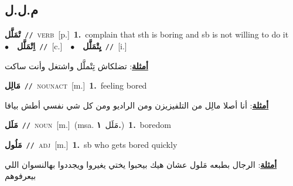 \documentclass[10pt,a4paper,twoside]{article} %
\begin{document}
\begin{multicols}{2}
\vspace{-3mm}
\subsection*{\color{blue}\foreignlanguage{arabic}{م.ل.ل}\color{blue}{}} 

{\setlength\topsep{0pt}\textbf{\foreignlanguage{arabic}{تْمَلَّل}}\ {\color{gray}\texttt{//}\color{black}}\ \textsc{verb}\ [p.]\ \textbf{1.}~complain that sth is boring and sb is not willing to do it\ \ $\bullet$\ \ \setlength\topsep{0pt}\textbf{\foreignlanguage{arabic}{اِتْمَلَّل}}\ {\color{gray}\texttt{//}\color{black}}\ [c.]\ \ $\bullet$\ \ \setlength\topsep{0pt}\textbf{\foreignlanguage{arabic}{يِتْمَلَّل}}\ {\color{gray}\texttt{//}\color{black}}\ [i.]\  \begin{flushright}\color{gray}\foreignlanguage{arabic}{\textbf{\underline{\foreignlanguage{arabic}{أمثلة}}}: تضلكاش تِتْملَّل واشتغل وأنت ساكت}\end{flushright}\color{black}} \vspace{2mm}

{\setlength\topsep{0pt}\textbf{\foreignlanguage{arabic}{مَالِل}}\ {\color{gray}\texttt{//}\color{black}}\ \textsc{noun\textunderscore act}\ [m.]\ \textbf{1.}~feeling bored\  \begin{flushright}\color{gray}\foreignlanguage{arabic}{\textbf{\underline{\foreignlanguage{arabic}{أمثلة}}}: أنا أصلا مالِل من التلفيزيزن ومن الراديو ومن كل شي نفسي أطش بيافا}\end{flushright}\color{black}} \vspace{2mm}

{\setlength\topsep{0pt}\textbf{\foreignlanguage{arabic}{مَلَل}}\ {\color{gray}\texttt{//}\color{black}}\ \textsc{noun}\ [m.]\ \color{gray}(msa. \foreignlanguage{arabic}{مَلَل}~\foreignlanguage{arabic}{\textbf{١.}})\color{black}\ \textbf{1.}~boredom\ } \vspace{2mm}

{\setlength\topsep{0pt}\textbf{\foreignlanguage{arabic}{مَلُول}}\ {\color{gray}\texttt{//}\color{black}}\ \textsc{adj}\ [m.]\ \textbf{1.}~sb who gets bored quickly\  \begin{flushright}\color{gray}\foreignlanguage{arabic}{\textbf{\underline{\foreignlanguage{arabic}{أمثلة}}}: الرجال بطبعه مَلول عشان هيك بيحبوا يختي يغيروا ويجددوا بهالنسوان اللي بيعرفوهم}\end{flushright}\color{black}} \vspace{2mm}


\end{multicols}
\end{document}
